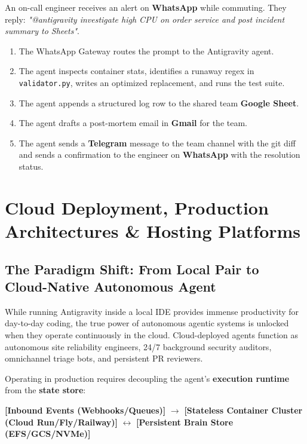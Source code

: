 \documentclass[11pt,a4paper,oneside]{book}
\begin{document}
\begin{labbox}
An on-call engineer receives an alert on \textbf{WhatsApp} while commuting. They reply: \textit{"@antigravity investigate high CPU on order service and post incident summary to Sheets"}.
\begin{enumerate}
    \item The WhatsApp Gateway routes the prompt to the Antigravity agent.
    \item The agent inspects container stats, identifies a runaway regex in \texttt{validator.py}, writes an optimized replacement, and runs the test suite.
    \item The agent appends a structured log row to the shared team \textbf{Google Sheet}.
    \item The agent drafts a post-mortem email in \textbf{Gmail} for the team.
    \item The agent sends a \textbf{Telegram} message to the team channel with the git diff and sends a confirmation to the engineer on \textbf{WhatsApp} with the resolution status.
\end{enumerate}
\end{labbox}

\chapter{Cloud Deployment, Production Architectures \& Hosting Platforms}

\section{The Paradigm Shift: From Local Pair to Cloud-Native Autonomous Agent}
While running Antigravity inside a local IDE provides immense productivity for day-to-day coding, the true power of autonomous agentic systems is unlocked when they operate continuously in the cloud. Cloud-deployed agents function as autonomous site reliability engineers, 24/7 background security auditors, omnichannel triage bots, and persistent PR reviewers.

Operating in production requires decoupling the agent's \textbf{execution runtime} from the \textbf{state store}:

\begin{center}
\textbf{[Inbound Events (Webhooks/Queues)]} $\longrightarrow$ \textbf{[Stateless Container Cluster (Cloud Run/Fly/Railway)]} $\longleftrightarrow$ \textbf{[Persistent Brain Store (EFS/GCS/NVMe)]}
\end{center}
\end{document}
